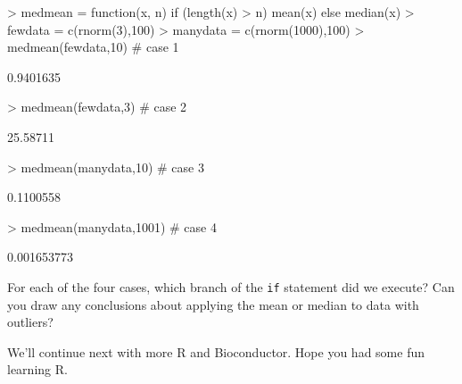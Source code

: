 \documentclass[12pt]{article}
\newcommand{\code}[1]{{\texttt{#1}}}
\begin{document}
\begin{Schunk}
\begin{Sinput}
> medmean = function(x, n) {if (length(x) > n) {mean(x)} else {median(x)}}
> fewdata = c(rnorm(3),100)
> manydata = c(rnorm(1000),100)
> medmean(fewdata,10)    # case 1
\end{Sinput}
\begin{Soutput}
[1] 0.9401635
\end{Soutput}
\begin{Sinput}
> medmean(fewdata,3)     # case 2
\end{Sinput}
\begin{Soutput}
[1] 25.58711
\end{Soutput}
\begin{Sinput}
> medmean(manydata,10)   # case 3   
\end{Sinput}
\begin{Soutput}
[1] 0.1100558
\end{Soutput}
\begin{Sinput}
> medmean(manydata,1001) # case 4
\end{Sinput}
\begin{Soutput}
[1] 0.001653773
\end{Soutput}
\end{Schunk}

For each of the four cases, which branch of the \code{if} statement did we execute?  Can you draw any conclusions about applying the mean or median to data with outliers?

We'll continue next with more R and Bioconductor.  Hope you had some fun learning R.  
\end{document}

